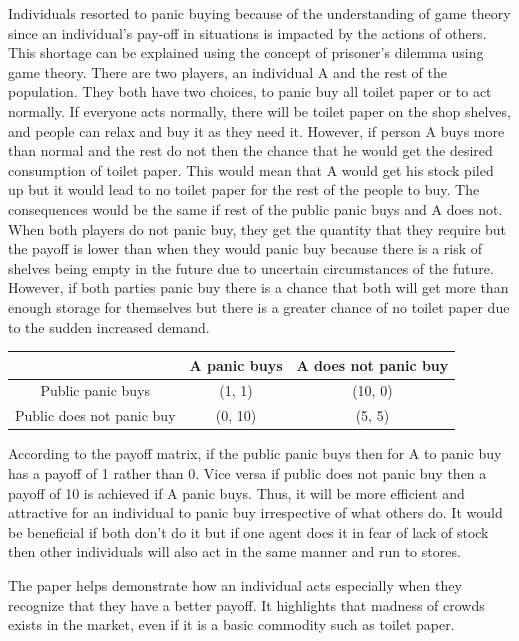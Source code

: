\documentclass[runningheads]{llncs}
\begin{document}
Individuals resorted to panic buying because of the understanding of game theory since an individual’s pay-off in situations is impacted by the actions of others. This shortage can be explained using the concept of prisoner’s dilemma using game theory. There are two players, an individual A and the rest of the population.
They both have two choices, to panic buy all toilet paper or to act normally. If everyone acts normally, there will be toilet paper on the shop shelves, and people can relax and buy it as they need it. However, if person A buys more than normal and the rest do not then the chance that he would get the desired consumption of toilet paper. 
This would mean that A would get his stock piled up but it would lead to no toilet paper for the rest of the people to buy. The consequences would be the same if rest of the public panic buys and A does not.  When both players do not panic buy, they get the quantity that they require but the payoff is lower than when they would panic buy because there is a risk of shelves being empty in the future due to uncertain circumstances of the future. However, if both parties panic buy there is a chance that both will get more than enough storage for themselves but there is a greater chance of no toilet paper due to the sudden increased demand.
\\
\begin{center}
\begin{tabular}{ | c | c| c | } 
\hline
 & A panic buys &  A does not panic buy \\ 
\hline
Public panic buys  & (1, 1)  & (10, 0) \\ 
\hline
Public does not panic buy  & (0, 10)  & (5, 5) \\ 
\hline
\end{tabular}
\end{center}

According to the payoff matrix, if the public panic buys then for A to panic buy has a payoff of 1 rather than 0. Vice versa if public does not panic buy then a payoff of 10 is achieved if A panic buys. Thus, it will be more efficient and attractive for an individual to panic buy irrespective of what others do. It would be beneficial if both don’t do it but if one agent does it in fear of lack of stock then other individuals will also act in the same manner and run to stores. 

The paper helps demonstrate how an individual acts especially when they recognize that they have a better payoff. It highlights that madness of crowds exists in the market, even if it is a basic commodity such as toilet paper.   
\end{document}
